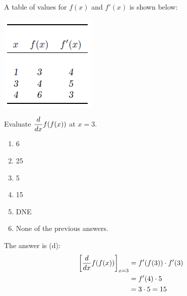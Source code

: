 \documentclass[nooutcomes]{ximera}
\begin{document}
\begin{problem}
 A table of values for $f(x)$ and $f'(x)$ is shown below:

\begin{image}
	\includegraphics{figure1.png}
\end{image}

  Evaluate $\displaystyle\frac{d}{dx} f(f(x))$ at $x = 3$.
  \begin{enumerate}
    \item 6
    \item 25
    \item 5
    \item 15
    \item DNE
    \item None of the previous answers.
  \end{enumerate}
  \begin{freeResponse}
    The answer is (d):
    \begin{align*}
      \bigg[ \frac{d}{dx} f(f(x)) \bigg]_{x = 3} &= f'(f(3)) \cdot f'(3) \\
      &= f'(4)\cdot 5 \\
      &= 3 \cdot 5 = 15
    \end{align*}
  \end{freeResponse}
	
\end{problem}
\end{document}
